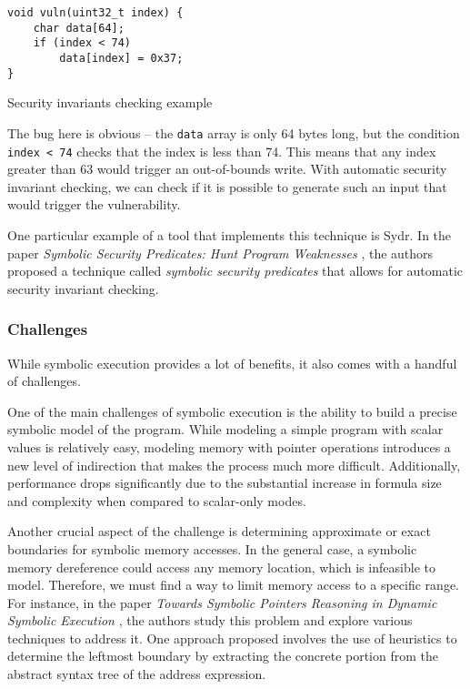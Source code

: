 \begin{listing}[htp]
	\centering
	\begin{minipage}{.4\linewidth}
		\begin{verbatim}
void vuln(uint32_t index) {
	char data[64];
	if (index < 74)
		data[index] = 0x37;
}
		\end{verbatim}
	\end{minipage}
	\caption{Security invariants checking example}
	\label{lst:example6}
\end{listing}

The bug here is obvious -- the \texttt{data} array is only 64 bytes long, but the condition \texttt{index < 74} checks that the index is less than 74. This means that any index greater than 63 would trigger an out-of-bounds write. With automatic security invariant checking, we can check if it is possible to generate such an input that would trigger the vulnerability.

One particular example of a tool that implements this technique is Sydr. In the paper \textit{Symbolic Security Predicates: Hunt Program Weaknesses} \cite{symbolic-security-predicates}, the authors proposed a technique called \textit{symbolic security predicates} that allows for automatic security invariant checking.

\subsubsection{Challenges} \label{symbolic_execution:challenges}

While symbolic execution provides a lot of benefits, it also comes with a handful of challenges.

 \label{symbolic_execution:challenges:symbolic_memory}

One of the main challenges of symbolic execution is the ability to build a precise symbolic model of the program. While modeling a simple program with scalar values is relatively easy, modeling memory with pointer operations introduces a new level of indirection that makes the process much more difficult. Additionally, performance drops significantly due to the substantial increase in formula size and complexity when compared to scalar-only modes.

Another crucial aspect of the challenge is determining approximate or exact boundaries for symbolic memory accesses. In the general case, a symbolic memory dereference could access any memory location, which is infeasible to model. Therefore, we must find a way to limit memory access to a specific range. For instance, in the paper \textit{Towards Symbolic Pointers Reasoning in Dynamic Symbolic Execution} \cite{symbolic-pointers-reasoning}, the authors study this problem and explore various techniques to address it. One approach proposed involves the use of heuristics to determine the leftmost boundary by extracting the concrete portion from the abstract syntax tree of the address expression.

